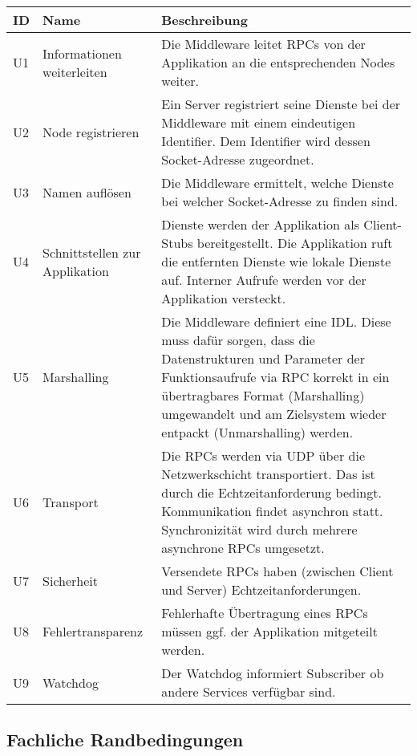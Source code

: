 \begin{tabular}{|p{1.5cm}|p{4cm}|p{8.5cm}|}
	\hline
	\textbf{ID} & \textbf{Name} & \textbf{Beschreibung} \\
	\hline
	U1 & Informationen weiterleiten & Die Middleware leitet RPCs von der Applikation an die entsprechenden Nodes weiter. \\
	\hline
	U2 & Node registrieren & Ein Server registriert seine Dienste bei der Middleware mit einem eindeutigen Identifier. Dem Identifier wird dessen Socket-Adresse zugeordnet. \\
	\hline
	U3 & Namen auflösen & Die Middleware ermittelt, welche Dienste bei welcher Socket-Adresse zu finden sind.\\
	\hline
	U4 & Schnittstellen zur Applikation & Dienste werden der Applikation als Client-Stubs bereitgestellt. Die Applikation ruft die entfernten Dienste wie lokale Dienste auf. Interner Aufrufe werden vor der Applikation versteckt. \\
	\hline
	U5 & Marshalling & Die Middleware definiert eine IDL. Diese muss dafür sorgen, dass die Datenstrukturen und Parameter der Funktionsaufrufe via RPC korrekt in ein übertragbares Format (Marshalling) umgewandelt und am Zielsystem wieder entpackt (Unmarshalling) werden. \\
	\hline
	U6 & Transport & Die RPCs werden via UDP über die Netzwerkschicht transportiert. Das ist durch die Echtzeitanforderung bedingt. Kommunikation findet asynchron statt. Synchronizität wird durch mehrere asynchrone RPCs umgesetzt.\\
	\hline 
	U7 & Sicherheit & Versendete RPCs haben (zwischen Client und Server) Echtzeitanforderungen. \\
	\hline
	U8 & Fehlertransparenz & Fehlerhafte Übertragung eines RPCs müssen ggf. der Applikation mitgeteilt werden. \\
	\hline
	U9 & Watchdog & Der Watchdog informiert Subscriber ob andere Services verfügbar sind.      %
	\hline
	
\end{tabular}

\subsection{Fachliche Randbedingungen}

